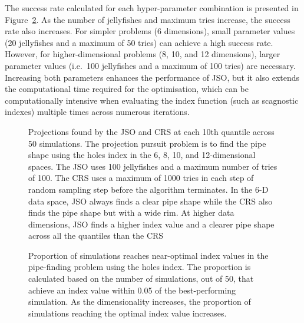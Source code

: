 \documentclass[
  number,
  preprint,
  3p]{elsarticle}
\begin{document}
The success rate calculated for each hyper-parameter combination is
presented in Figure~\ref{fig-proportion}. As the number of jellyfishes
and maximum tries increase, the success rate also increases. For simpler
problems (6 dimensions), small parameter values (20 jellyfishes and a
maximum of 50 tries) can achieve a high success rate. However, for
higher-dimensional problems (8, 10, and 12 dimensions), larger parameter
values (i.e.~100 jellyfishes and a maximum of 100 tries) are necessary.
Increasing both parameters enhances the performance of JSO, but it also
extends the computational time required for the optimisation, which can
be computationally intensive when evaluating the index function (such as
scagnostic indexes) multiple times across numerous iterations.

\begin{figure}


\caption{\label{fig-proj}Projections found by the JSO and CRS at each
10th quantile across 50 simulations. The projection pursuit problem is
to find the pipe shape using the holes index in the 6, 8, 10, and
12-dimensional spaces. The JSO uses 100 jellyfishes and a maximum number
of tries of 100. The CRS uses a maximum of 1000 tries in each step of
random sampling step before the algorithm terminates. In the 6-D data
space, JSO always finds a clear pipe shape while the CRS also finds the
pipe shape but with a wide rim. At higher data dimensions, JSO finds a
higher index value and a clearer pipe shape across all the quantiles
than the CRS}

\end{figure}%

\begin{figure}


\caption{\label{fig-proportion}Proportion of simulations reaches
near-optimal index values in the pipe-finding problem using the holes
index. The proportion is calculated based on the number of simulations,
out of 50, that achieve an index value within 0.05 of the
best-performing simulation. As the dimensionality increases, the
proportion of simulations reaching the optimal index value increases.}

\end{figure}%
\end{document}
